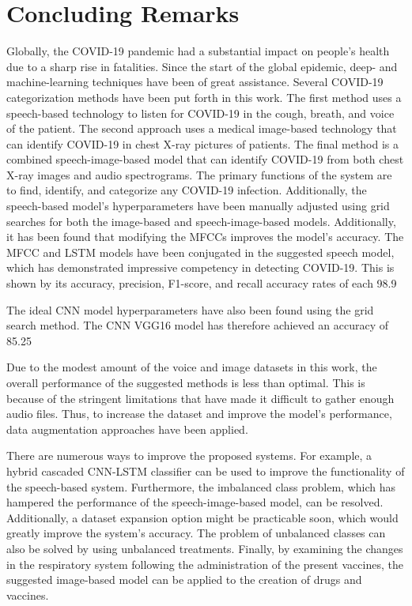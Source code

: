 \section{Concluding Remarks}
Globally, the COVID-19 pandemic had a substantial impact on people's health due to a sharp rise in fatalities. Since the start of the global epidemic, deep- and machine-learning techniques have been of great assistance. Several COVID-19 categorization methods have been put forth in this work. The first method uses a speech-based technology to listen for COVID-19 in the cough, breath, and voice of the patient. The second approach uses a medical image-based technology that can identify COVID-19 in chest X-ray pictures of patients. The final method is a combined speech-image-based model that can identify COVID-19 from both chest X-ray images and audio spectrograms. The primary functions of the system are to find, identify, and categorize any COVID-19 infection. Additionally, the speech-based model's hyperparameters have been manually adjusted using grid searches for both the image-based and speech-image-based models. Additionally, it has been found that modifying the MFCCs improves the model's accuracy. The MFCC and LSTM models have been conjugated in the suggested speech model, which has demonstrated impressive competency in detecting COVID-19. This is shown by its accuracy, precision, F1-score, and recall accuracy rates of each 98.9%

The ideal CNN model hyperparameters have also been found using the grid search method. The CNN VGG16 model has therefore achieved an accuracy of 85.25%

Due to the modest amount of the voice and image datasets in this work, the overall performance of the suggested methods is less than optimal. This is because of the stringent limitations that have made it difficult to gather enough audio files. Thus, to increase the dataset and improve the model's performance, data augmentation approaches have been applied.

There are numerous ways to improve the proposed systems. For example, a hybrid cascaded CNN-LSTM classifier can be used to improve the functionality of the speech-based system. Furthermore, the imbalanced class problem, which has hampered the performance of the speech-image-based model, can be resolved.
Additionally, a dataset expansion option might be practicable soon, which would greatly improve the system's accuracy. The problem of unbalanced classes can also be solved by using unbalanced treatments. Finally, by examining the changes in the respiratory system following the administration of the present vaccines, the suggested image-based model can be applied to the creation of drugs and vaccines.
